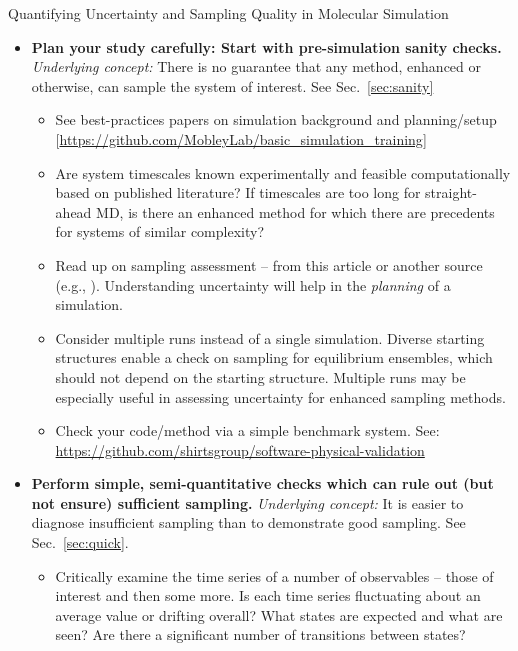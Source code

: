 \documentclass[9pt,bestpractices]{livecoms}
\begin{document}
\begin{Checklists*}[p!]
\begin{checklist}{Quantifying Uncertainty and Sampling Quality in Molecular Simulation}
\begin{itemize}
\item
\textbf{Plan your study carefully: Start with pre-simulation sanity checks.}  \emph{Underlying concept:} There is no guarantee that any method, enhanced or otherwise, can sample the system of interest.  See Sec.\ \ref{sec:sanity}
    \begin{itemize}
    \item See best-practices papers on simulation background and planning/setup [\url{https://github.com/MobleyLab/basic_simulation_training}]
    \item Are system timescales known experimentally and feasible computationally based on published literature?
      If timescales are too long for straight-ahead MD, is there an enhanced method for which there are precedents for systems of similar complexity?
    \item Read up on sampling assessment -- from this article or another source (e.g., \cite{Grossfield2009}).  Understanding uncertainty will help in the \emph{planning} of a simulation.
    \item Consider multiple runs instead of a single simulation.  Diverse starting structures enable a check on sampling for equilibrium ensembles, which should not depend on the starting structure.  Multiple runs may be especially useful in assessing uncertainty for enhanced sampling methods.  
    \item Check your code/method via a simple benchmark system.  See: \url{https://github.com/shirtsgroup/software-physical-validation}
    \end{itemize}
\item
\textbf{Perform simple, semi-quantitative checks which can rule out (but not ensure) sufficient sampling.} \emph{Underlying concept:} It is easier to diagnose insufficient sampling than to demonstrate good sampling.  See Sec.\ \ref{sec:quick}.
    \begin{itemize}
    \item Critically examine the time series of a number of observables -- those of interest and then some more.  Is each time series fluctuating about an average value or drifting overall?  What states are expected and what are seen?  Are there a significant number of transitions between states?

\end{itemize}
\end{itemize}
\end{checklist}
\end{Checklists*}
\end{document}
